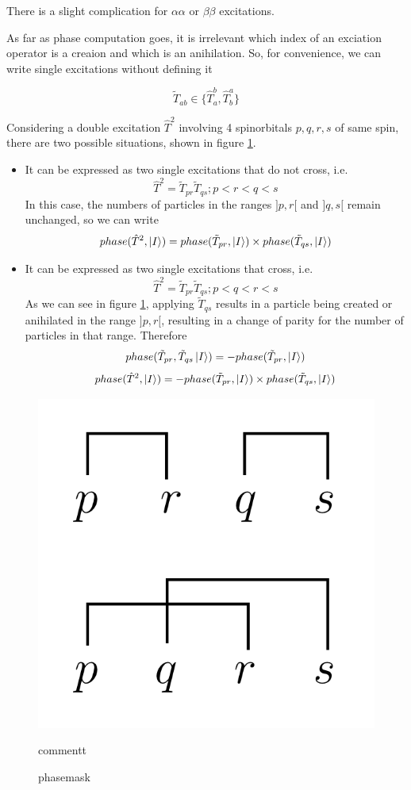 \documentclass[./thesis.tex]{subfiles}
\begin{document}
There is a slight complication for $\alpha \alpha$ or $\beta \beta$ excitations.

As far as phase computation goes, it is irrelevant which index of an exciation operator is a creaion and which is an anihilation. So, for convenience, we can write single excitations without defining it

$$\tilde T_{ab} \in \{\hat T_a^b, \hat T_b^a \}$$

Considering a double excitation $\hat T^2$ involving 4 spinorbitals $p,q,r,s$ of same spin, there are two possible situations, shown in figure \ref{fig:biphasefactor}. 


\begin{itemize}
\item
It can be expressed as two single excitations that do not cross, i.e.
$$\hat T^2=\tilde T_{pr} \tilde T_{qs};p<r<q<s$$
In this case, the numbers of particles in the ranges $]p, r[$ and $]q, s[$ remain unchanged, so we can write
$$phase(\hat T^2, \ket I) = phase(\tilde T_{pr}, \ket I) \times phase(\tilde T_{qs}, \ket I) $$

\item
It can be expressed as two single excitations that cross, i.e.
$$\hat T^2=\tilde T_{pr} \tilde T_{qs};p<q<r<s$$
As we can see in figure \ref{fig:biphasefactor}, applying  $\tilde T_{qs}$ results in a particle being created or anihilated in the range $]p,r[$, resulting in a change of parity for the number of particles in that range. Therefore
$$phase(\tilde T_{pr}, \tilde T_{qs} \ket I) = -phase(\tilde T_{pr}, \ket I)$$ 
$$phase(\hat T^2, \ket I) = -phase(\tilde T_{pr}, \ket I) \times phase(\tilde T_{ qs}, \ket I) $$
\end{itemize}



\begin{figure}[h!]
	\begin{center}
		\includegraphics[width=0.4\columnwidth]{figures/determinant_driven/biphasefactor}
		\caption{
		\label{fig:biphasefactor}%
		phasemask
		}
		commentt
	\end{center}
\end{figure}
\end{document}
